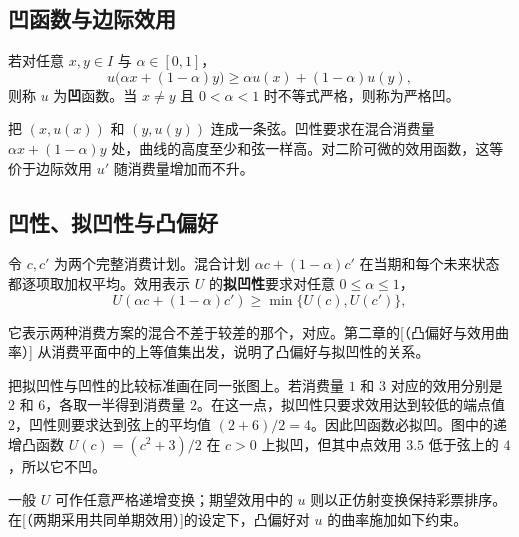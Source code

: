 \subsection{凹函数与边际效用}
\begin{tcolorbox}[knowledge]
 若对任意 $x,y\in I$ 与 $\alpha\in[0,1]$，
\[
    u\bigl(\alpha x+(1-\alpha)y\bigr)\ge \alpha u(x)+(1-\alpha)u(y),
\]
则称 $u$ 为\textbf{凹}函数。当 $x\ne y$ 且 $0<\alpha<1$ 时不等式严格，则称为严格凹。
\end{tcolorbox}

把 $(x,u(x))$ 和 $(y,u(y))$ 连成一条弦。凹性要求在混合消费量 $\alpha x+(1-\alpha)y$ 处，曲线的高度至少和弦一样高。对二阶可微的效用函数，这等价于边际效用 $u'$ 随消费量增加而不升。

\subsection{凹性、拟凹性与凸偏好}
令 $c,c'$ 为两个完整消费计划。混合计划 $\alpha c+(1-\alpha)c'$ 在当期和每个未来状态都逐项取加权平均。效用表示 $U$ 的\textbf{拟凹性}要求对任意 $0\le\alpha\le1$，
\[
 U(\alpha c+(1-\alpha)c')\ge\min\{U(c),U(c')\},
\]

它表示两种消费方案的混合不差于较差的那个，对应。第二章的[（凸偏好与效用曲率）] 从消费平面中的上等值集出发，说明了凸偏好与拟凹性的关系。

 把拟凹性与凹性的比较标准画在同一张图上。若消费量 $1$ 和 $3$ 对应的效用分别是 $2$ 和 $6$，各取一半得到消费量 $2$。在这一点，拟凹性只要求效用达到较低的端点值 $2$，凹性则要求达到弦上的平均值 $(2+6)/2=4$。因此凹函数必拟凹。图中的递增凸函数 $U(c)=(c^2+3)/2$ 在 $c>0$ 上拟凹，但其中点效用 $3.5$ 低于弦上的 $4$，所以它不凹。

\begin{center}
\begin{minipage}{\linewidth}
%
\centering
{}
\end{minipage}
\end{center}

一般 $U$ 可作任意严格递增变换；期望效用中的 $u$ 则以正仿射变换保持彩票排序。在[（两期采用共同单期效用）]的设定下，凸偏好对 $u$ 的曲率施加如下约束。

